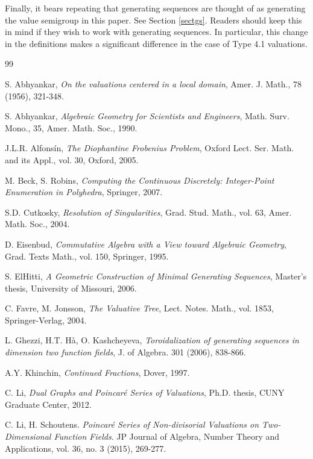 \documentclass[11pt]{amsart}
\theoremstyle{definition}
\begin{document}
{Finally, it bears repeating that generating sequences are thought of as generating the value semigroup in this paper. See Section \ref{sectgs}. Readers should keep this in mind if they wish to work with generating sequences. In particular, this change in the definitions makes a significant difference in the case of Type 4.1 valuations.

\begin{thebibliography}{99}

S. Abhyankar, {\it On the valuations centered in a local domain}, Amer. J. Math., 78 (1956), 321-348.

S. Abhyankar, {\it Algebraic Geometry for Scientists and Engineers}, Math. Surv. Mono., 35, Amer. Math. Soc., 1990.

J.L.R. Alfons\'in, {\it The Diophantine Frobenius Problem}, Oxford Lect. Ser. Math. and its Appl., vol. 30, Oxford, 2005.

M. Beck, S. Robins, {\it Computing the Continuous Discretely: Integer-Point Enumeration in Polyhedra}, Springer, 2007.

S.D. Cutkosky, {\it Resolution of Singularities}, Grad. Stud. Math., vol. 63, Amer. Math. Soc., 2004.

D. Eisenbud, {\it Commutative Algebra with a View toward Algebraic Geometry}, Grad. Texts Math., vol. 150, Springer, 1995.

S. ElHitti, {\it A Geometric Construction of Minimal Generating Sequences}, Master's thesis, University of Missouri, 2006.

C. Favre, M. Jonsson, {\it The Valuative Tree}, Lect. Notes. Math., vol. 1853, Springer-Verlag, 2004.

L. Ghezzi, H.T. H\`a, O. Kashcheyeva, {\it Toroidalization of generating sequences in dimension two function fields}, J. of Algebra. 301 (2006), 838-866.

A.Y. Khinchin, {\it Continued Fractions}, Dover, 1997.

C. Li, {\it Dual Graphs and Poincar\'e Series of Valuations}, Ph.D. thesis, CUNY Graduate Center, 2012.

C. Li, H. Schoutens. {\it Poincar\'e Series of Non-divisorial Valuations on Two-Dimensional Function Fields}. JP
Journal of Algebra, Number Theory and Applications, vol. 36, no. 3 (2015), 269-277.


\end{thebibliography}}
\end{document}
